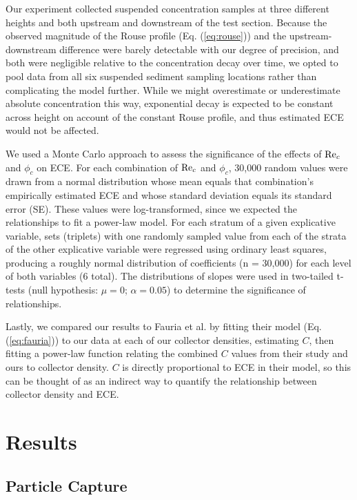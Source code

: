 \documentclass[geosciences,article,submit,moreauthors,pdftex]{Definitions/mdpi}
\begin{document}
Our experiment collected suspended concentration samples at three different heights and both upstream and downstream of the test section. Because the observed magnitude of the Rouse profile (Eq. (\ref{eq:rouse})) and the upstream-downstream difference were barely detectable with our degree of precision, and both were negligible relative to the concentration decay over time, we opted to pool data from all six suspended sediment sampling locations rather than complicating the model further. While we might overestimate or underestimate absolute concentration this way, exponential decay is expected to be constant across height on account of the constant Rouse profile, and thus estimated ECE would not be affected.

We used a Monte Carlo approach to assess the significance of the effects of $\mathrm{Re}_c$ and $\phi_c$ on ECE. For each combination of $\mathrm{Re}_c$ and $\phi_c$, 30,000 random values were drawn from a normal distribution whose mean equals that combination's empirically estimated ECE and whose standard deviation equals its standard error (SE). These values were log-transformed, since we expected the relationships to fit a power-law model. For each stratum of a given explicative variable, sets (triplets) with one randomly sampled value from each of the strata of the other explicative variable were regressed using ordinary least squares, producing a roughly normal distribution of coefficients (n = 30,000) for each level of both variables (6 total). The distributions of slopes were used in two-tailed t-tests (null hypothesis: $\mu = 0$; $\alpha = 0.05$) to determine the significance of relationships.

Lastly, we compared our results to Fauria et al. \cite{Fauria_2015} by fitting their model (Eq. (\ref{eq:fauria})) to our data at each of our collector densities, estimating $C$, then fitting a power-law function relating the combined $C$ values from their study and ours to collector density. $C$ is directly proportional to ECE in their model, so this can be thought of as an indirect way to quantify the relationship between collector density and ECE.

\section{Results}

\subsection{Particle Capture}
\end{document}
